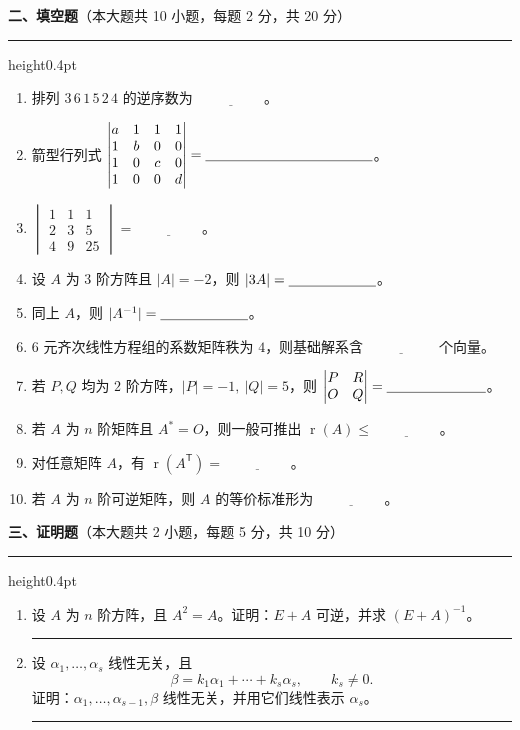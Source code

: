 \documentclass[12pt]{ctexart}
\newcommand{\rnk}{\operatorname{r}}
\newcommand{\blank}[1][2.6cm]{\underline{\hspace{#1}}}
\newcommand{\bigsection}[2]{%
  \vspace{7pt}%
  {\noindent\bfseries\large #1}\hfill{\normalsize（本大题共 #2）}\par
  \vspace{2pt}\hrule height0.4pt\vspace{8pt}}
\newcommand{\workarea}[1]{\par\vspace{0.35em}\noindent\rule{\linewidth}{0.25pt}\par\vspace{#1}}
\begin{document}
\bigsection{二、填空题}{10 小题，每题 2 分，共 20 分}

\begin{enumerate}[label=\arabic*.]
\item 排列 $3\,6\,1\,5\,2\,4$ 的逆序数为 $\blank[2cm]$。
\item 箭型行列式
  $\begin{vmatrix}
  a&1&1&1\\
  1&b&0&0\\
  1&0&c&0\\
  1&0&0&d
  \end{vmatrix}=\blank[4.2cm]$。
\item $\begin{vmatrix}1&1&1\\2&3&5\\4&9&25\end{vmatrix}=\blank[2cm]$。
\item 设 $A$ 为 $3$ 阶方阵且 $|A|=-2$，则 $|3A|=\blank[2.2cm]$。
\item 同上 $A$，则 $|A^{-1}|=\blank[2.2cm]$。
\item $6$ 元齐次线性方程组的系数矩阵秩为 $4$，则基础解系含 $\blank[2cm]$ 个向量。
\item 若 $P,Q$ 均为 $2$ 阶方阵，$|P|=-1,\ |Q|=5$，则
  $\begin{vmatrix}P&R\\ O&Q\end{vmatrix}=\blank[2.5cm]$。
\item 若 $A$ 为 $n$ 阶矩阵且 $A^{*}=O$，则一般可推出 $\rnk(A)\leq\blank[2cm]$。
\item 对任意矩阵 $A$，有 $\rnk(A^{\mathsf T})=\blank[2cm]$。
\item 若 $A$ 为 $n$ 阶可逆矩阵，则 $A$ 的等价标准形为 $\blank[2cm]$。
\end{enumerate}

\bigsection{三、证明题}{2 小题，每题 5 分，共 10 分}

\begin{enumerate}[label=\arabic*.]
\item 设 $A$ 为 $n$ 阶方阵，且 $A^{2}=A$。证明：$E+A$ 可逆，并求 $(E+A)^{-1}$。
\workarea{4.4cm}

\item 设 $\alpha_1,\dots,\alpha_s$ 线性无关，且
  \[
  \beta=k_1\alpha_1+\cdots+k_s\alpha_s,\qquad k_s\neq0.
  \]
  证明：$\alpha_1,\dots,\alpha_{s-1},\beta$ 线性无关，并用它们线性表示 $\alpha_s$。
\workarea{4.4cm}
\end{enumerate}
\end{document}
